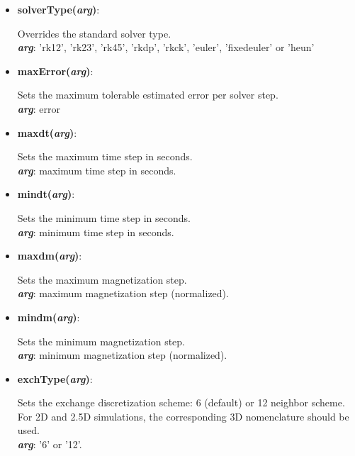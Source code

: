 \begin{itemize}

 \item {\textbf{solverType(\textit{arg})}:
				\flushright\parbox{0.9 \textwidth}{\vspace{-0.25cm} 
				Overrides the standard solver type.\\
				\textbf{\textit{arg}}: 'rk12', 'rk23', 'rk45', 'rkdp', 'rkck', 'euler', 'fixedeuler' or 'heun' 
				}\flushleft}

 \item {\vspace{-0.4cm}\textbf{maxError(\textit{arg})}:
				\flushright\parbox{0.9 \textwidth}{\vspace{-0.25cm} 
				Sets the maximum tolerable estimated error per solver step.\\
				\textbf{\textit{arg}}: error
				}\flushleft}

 \item {\vspace{-0.4cm}\textbf{maxdt(\textit{arg})}:
				\flushright\parbox{0.9 \textwidth}{\vspace{-0.25cm} 
				Sets the maximum time step in seconds.\\
				\textbf{\textit{arg}}: maximum time step in seconds.
				}\flushleft}

 \item {\vspace{-0.4cm}\textbf{mindt(\textit{arg})}:
				\flushright\parbox{0.9 \textwidth}{\vspace{-0.25cm} 
				Sets the minimum time step in seconds.\\
				\textbf{\textit{arg}}: minimum time step in seconds.
				}\flushleft}

 \item {\vspace{-0.4cm}\textbf{maxdm(\textit{arg})}:
				\flushright\parbox{0.9 \textwidth}{\vspace{-0.25cm} 
				Sets the maximum magnetization step.\\
				\textbf{\textit{arg}}: maximum magnetization step (normalized).
				}\flushleft}

 \item {\vspace{-0.4cm}\textbf{mindm(\textit{arg})}:
				\flushright\parbox{0.9 \textwidth}{\vspace{-0.25cm} 
				Sets the minimum magnetization step.\\
				\textbf{\textit{arg}}: minimum magnetization step (normalized).
				}\flushleft}

 \item {\vspace{-0.4cm}\textbf{exchType(\textit{arg})}:
				\flushright\parbox{0.9 \textwidth}{\vspace{-0.25cm} 
				Sets the exchange discretization scheme: 6 (default) or 12 neighbor scheme.  For 2D and 2.5D simulations, the corresponding 3D nomenclature should be used.\\
				\textbf{\textit{arg}}: '6' or '12'.
				}\flushleft}

\end{itemize}


